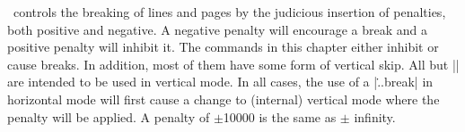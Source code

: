   \relax \fi %

\def\cqu{}

\tex\ controls the breaking of lines and pages by the judicious insertion of
penalties, both positive and negative. A negative penalty will encourage
a break
and a positive penalty will inhibit it. The commands in this chapter either
inhibit or cause breaks. In addition, most of them have some form of vertical
skip. All but |\linebreak| are intended to be used in vertical mode. In all
cases, the use of a |\...break| in horizontal mode will first cause a change
to (internal) vertical mode where the penalty will be applied. A penalty of
$\pm$10000 is the same as $\pm$ infinity. 

